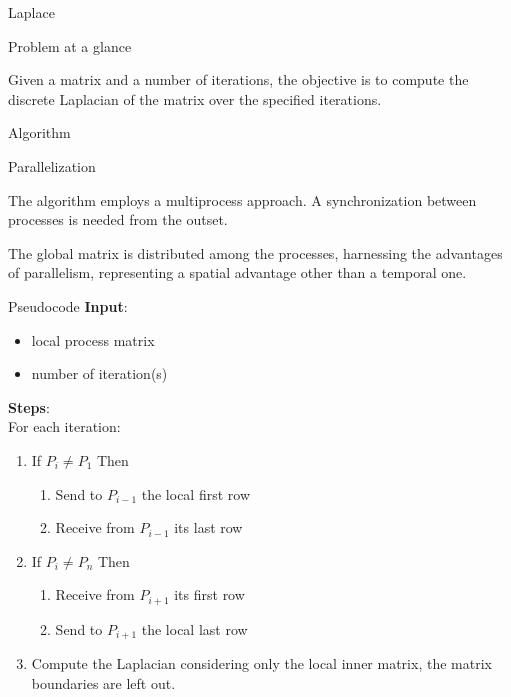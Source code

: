 \begin{chapter}{Laplace}
    \begin{section}{Problem at a glance}
        \par Given a matrix and a number of iterations, the objective is to compute the discrete Laplacian of the matrix over the specified iterations.
    \end{section}
    \begin{section}{Algorithm}
        \begin{subsection}{Parallelization}
            \par The algorithm employs a multiprocess approach. A synchronization between processes is needed from the outset.
            \par The global matrix is distributed among the processes, harnessing the advantages of parallelism, representing a spatial advantage other than a temporal one.
        \end{subsection}
        \begin{subsection}{Pseudocode}
            \textbf{Input}:
            \begin{itemize}
                \item local process matrix
                \item number of iteration(s)
            \end{itemize}
            \textbf{Steps}:\\
            For each iteration:
            \begin{enumerate}
                \item If $P_i \neq P_1$ Then
                \begin{enumerate}
                    \item Send to $P_{i-1}$ the local first row
                    \item Receive from $P_{i-1}$ its last row
                \end{enumerate}
                \item If $P_i \neq P_n$ Then
                \begin{enumerate}
                    \item Receive from $P_{i+1}$ its first row
                    \item Send to $P_{i+1}$ the local last row
                \end{enumerate}
                \item Compute the Laplacian considering only the local inner matrix, the matrix boundaries are left out.

\end{enumerate}
\end{subsection}
\end{section}
\end{chapter}
